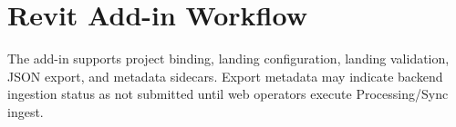 \section{Revit Add-in Workflow}
The add-in supports project binding, landing configuration, landing validation, JSON export, and metadata sidecars. Export metadata may indicate backend ingestion status as not submitted until web operators execute Processing/Sync ingest.

